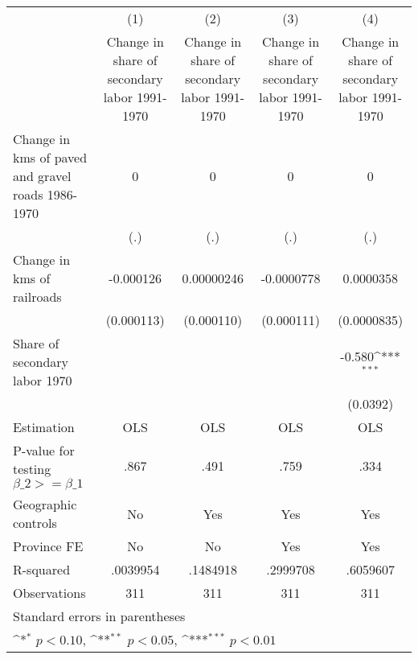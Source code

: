 {
\def\sym#1{\ifmmode^{#1}\else\(^{#1}\)\fi}
\begin{tabular}{l*{4}{c}}
\hline\hline
                    &\multicolumn{1}{c}{(1)}&\multicolumn{1}{c}{(2)}&\multicolumn{1}{c}{(3)}&\multicolumn{1}{c}{(4)}\\
                    &\multicolumn{1}{c}{Change in share of secondary labor 1991-1970}&\multicolumn{1}{c}{Change in share of secondary labor 1991-1970}&\multicolumn{1}{c}{Change in share of secondary labor 1991-1970}&\multicolumn{1}{c}{Change in share of secondary labor 1991-1970}\\
\hline
Change in kms of paved and gravel roads 1986-1970&           0         &           0         &           0         &           0         \\
                    &         (.)         &         (.)         &         (.)         &         (.)         \\
[1em]
Change in kms of railroads&   -0.000126         &  0.00000246         &  -0.0000778         &   0.0000358         \\
                    &  (0.000113)         &  (0.000110)         &  (0.000111)         & (0.0000835)         \\
[1em]
Share of secondary labor 1970&                     &                     &                     &      -0.580\sym{***}\\
                    &                     &                     &                     &    (0.0392)         \\
\hline
Estimation          &         OLS         &         OLS         &         OLS         &         OLS         \\
P-value for testing $\beta\_2 >= \beta\_1$&        .867         &        .491         &        .759         &        .334         \\
Geographic controls &          No         &         Yes         &         Yes         &         Yes         \\
Province FE         &          No         &          No         &         Yes         &         Yes         \\
R-squared           &    .0039954         &    .1484918         &    .2999708         &    .6059607         \\
Observations        &         311         &         311         &         311         &         311         \\
\hline\hline
\multicolumn{5}{l}{\footnotesize Standard errors in parentheses}\\
\multicolumn{5}{l}{\footnotesize \sym{*} \(p<0.10\), \sym{**} \(p<0.05\), \sym{***} \(p<0.01\)}\\
\end{tabular}
}

